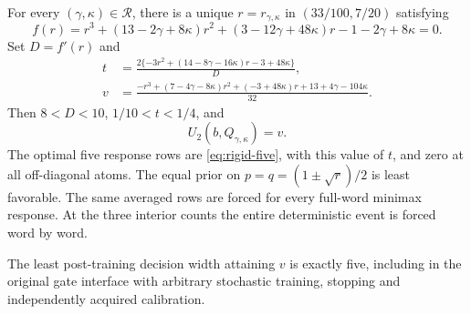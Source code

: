 \begin{theorem}
\label{thm:positive-saddle}
For every $(\gamma,\kappa)\in\mathcal R$, there is a unique
$r=r_{\gamma,\kappa}$ in $(33/100,7/20)$ satisfying
\begin{equation}\label{eq:leak-cubic}
 f(r)=r^3+(13-2\gamma+8\kappa)r^2
             +(3-12\gamma+48\kappa)r-1-2\gamma+8\kappa=0.
\end{equation}
Set $D=f'(r)$ and
\begin{align}
 t&=\frac{2\{-3r^2+(14-8\gamma-16\kappa)r-3+48\kappa\}}{D},
                                                       \label{eq:leak-tie}\\
 v&=\frac{-r^3+(7-4\gamma-8\kappa)r^2
                     +(-3+48\kappa)r+13+4\gamma-104\kappa}{32}.
                                                       \label{eq:leak-value}
\end{align}
Then $8<D<10$, $1/10<t<1/4$, and
\[
                         U_2(b,Q_{\gamma,\kappa})=v.
\]
The optimal five response rows are \eqref{eq:rigid-five}, with this
value of $t$, and zero at all off-diagonal atoms. The equal prior on
$p=q=(1\pm\sqrt r)/2$ is least favorable. The same averaged rows are
forced for every full-word minimax response. At the three interior
counts the entire deterministic event is forced word by word.

The least post-training decision width attaining $v$ is exactly five,
including in the original gate interface with arbitrary stochastic
training, stopping and independently acquired calibration.
\end{theorem}
